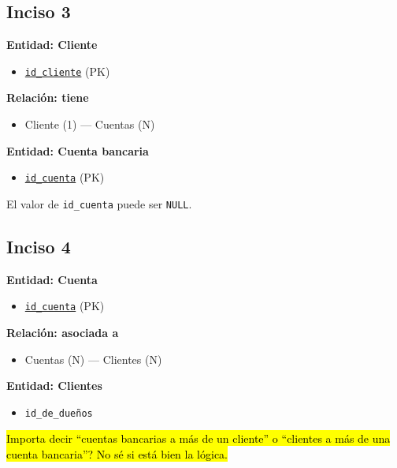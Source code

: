 \documentclass[a4paper,12pt]{article}
\begin{document}
        \subsection*{Inciso 3}
            \textbf{Entidad: Cliente}
                \begin{itemize}
                    \item \underline{\texttt{id\_cliente}} (PK)
                \end{itemize}

            \textbf{Relación: tiene}
                \begin{itemize}
                    \item Cliente (1) --- Cuentas (N)
                \end{itemize}

            \textbf{Entidad: Cuenta bancaria}
                \begin{itemize}
                    \item \underline{\texttt{id\_cuenta}} (PK)
                \end{itemize}
                \noindent El valor de \texttt{id\_cuenta} puede ser \texttt{NULL}.

        \subsection*{Inciso 4}
            \textbf{Entidad: Cuenta}
                \begin{itemize}
                    \item \underline{\texttt{id\_cuenta}} (PK)
                \end{itemize}

            \textbf{Relación: asociada a}
                \begin{itemize}
                    \item Cuentas (N) --- Clientes (N)
                \end{itemize}

            \textbf{Entidad: Clientes}
                \begin{itemize}
                    \item \texttt{id\_de\_dueños}
                \end{itemize}
                \noindent \hl{Importa decir ``cuentas bancarias a más de un cliente'' o ``clientes a más de una cuenta bancaria''? No sé si está bien la lógica.}
\end{document}

